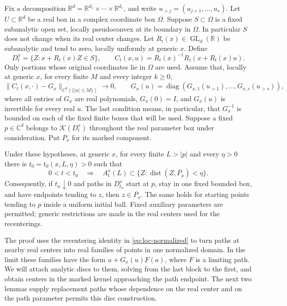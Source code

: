 Fix a decomposition $\mathbb{R}^d=\mathbb{R}^{d_1}\times\cdots \times\mathbb{R}^{d_s}$, and write $u_{>j}=(u_{j+1},\ldots,u_s)$. Let $U\subset\mathbb{R}^d$ be a real box in a complex coordinate box $\Omega$.  Suppose $S\subset\Omega$ is a fixed subanalytic open set, locally pseudoconvex at its boundary in $\Omega$.  In particular $S$ does not change when its real center changes.  Let $R_t(x)\in\operatorname{GL}_d(\mathbb{R})$ be subanalytic and tend to zero, locally uniformly at generic $x$.  Define
\begin{equation}\label{eq:loc-normalized}
 D_t^x=\{Z:x+R_t(x)Z\in S\},\qquad
 C_t(x,u)=R_t(x)^{-1}R_t(x+R_t(x)u).
\end{equation}
Only portions whose original coordinates lie in $\Omega$ are used. Assume that, locally at generic $x$, for every finite $M$ and every integer $k\geq0$,
\begin{equation}\label{eq:loc-ratio}
 \|C_t(x,\cdot)-G_x\|_{C^k(\{|u|\leq M\})}\longrightarrow0,
 \qquad
 G_x(u)=\operatorname{diag}
       (G_{x,1}(u_{>1}),\ldots,G_{x,s}(u_{>s})),
\end{equation}
where all entries of $G_x$ are real polynomials, $G_x(0)=I$, and $G_x(u)$ is invertible for every real $u$. The last condition means, in particular, that $G_x^{-1}$ is bounded on each of the fixed finite boxes that will be used.  Suppose a fixed $p\in\mathbb{C}^d$ belongs to $\mathcal{K}(D_t^x)$ throughout the real parameter box under consideration.  Put $P_x$ for its marked component.

\begin{theorem}\label{thm:loc-theorem}
Under these hypotheses, at generic $x$, for every finite $L>|p|$ and every $\eta>0$ there is $t_0=t_0(x,L,\eta)>0$ such that
\begin{equation}\label{eq:loc-upper}
 0<t<t_0\quad\Longrightarrow\quad
 A_t^x(L)\subset\{Z:\operatorname{dist}(Z,\overline{P_x})<\eta\}.
\end{equation}
Consequently, if $t_n\downarrow0$ and paths in $D_{t_n}^x$ start at $p$, stay in one fixed bounded box, and have endpoints tending to $z$, then $z\in\overline{P_x}$.  The same holds for starting points tending to $p$ inside a uniform initial ball.  Fixed auxiliary parameters are permitted; generic restrictions are made in the real centers used for the recenterings.
\end{theorem}

The proof uses the recentering identity in \eqref{eq:loc-normalized} to turn paths at nearby real centers into real families of points in one normalized domain.  In the limit these families have the form $u+G_x(u)F(a)$, where $F$ is a limiting path.  We will attach analytic discs to them, solving from the last block to the first, and obtain centers in the marked kernel approaching the path endpoint.  The next two lemmas supply replacement paths whose dependence on the real center and on the path parameter permits this disc construction.

